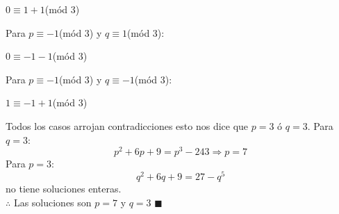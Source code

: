 \documentclass{book}
\begin{document}
\begin{enumerate}
\begin{center}
            $0\equiv 1+1$(mód 3)
        \end{center}
        Para $p\equiv -1 $(mód 3)  y $q\equiv 1 $(mód 3):
        \begin{center}
            $0\equiv -1-1$(mód 3)
        \end{center}
        Para $p\equiv -1 $(mód 3)  y $q\equiv -1 $(mód 3):
        \begin{center}
            $1\equiv -1+1$(mód 3)
        \end{center}
        Todos los casos arrojan contradicciones esto nos dice que $p=3$ ó  $q=3$.
        Para $q=3$:
        $$p^2+6p+9=p^3-243 \Rightarrow p=7$$
        Para $p=3$:
        $$q^2+6q+9=27-q^5 $$  no tiene soluciones enteras.\\
        $\therefore$ Las soluciones son $p=7$ y $q=3$ $\blacksquare$\\



\end{enumerate}
\end{document}
